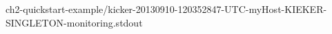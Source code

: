 \setTextListing

{ch2-quickstart-example/kicker-20130910-120352847-UTC-myHost-KIEKER-SINGLETON-monitoring.stdout}